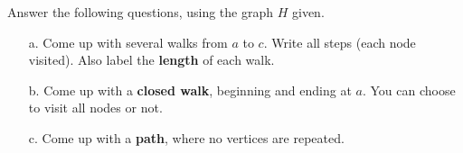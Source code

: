         \begin{questionNOGRADE}{\thequestion}
            Answer the following questions, using the graph $H$ given.

            \begin{center}
            \end{center}

            \begin{enumerate}
                \item[a.]   Come up with several walks from $a$ to $c$. Write all steps (each node visited).
                    Also label the \textbf{length} of each walk.
                \item[b.]   Come up with a \textbf{closed walk}, beginning and ending at $a$. You can choose to visit all nodes or not. \solution{}{ \vspace{1cm} }
                \item[c.]   Come up with a \textbf{path}, where no vertices are repeated. \solution{}{ \vspace{1cm} }
            \end{enumerate}
            
        \end{questionNOGRADE}

    \newpage

